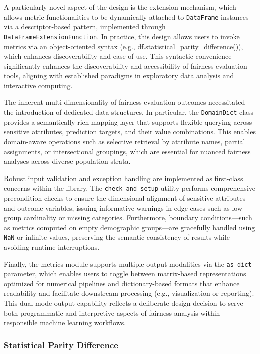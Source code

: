 \documentclass[12pt,a4paper,openright,twoside]{book}
\begin{document}
A particularly novel aspect of the design is the extension mechanism, which allows metric functionalities to be dynamically attached to \texttt{DataFrame} instances via a descriptor-based pattern, implemented through \texttt{DataFrameExtensionFunction}. In practice, this design allows users to invoke metrics via an object-oriented syntax (e.g., df.statistical\_parity\_difference()), which enhances discoverability and ease of use. This syntactic convenience significantly enhances the discoverability and accessibility of fairness evaluation tools, aligning with established paradigms in exploratory data analysis and interactive computing.

The inherent multi-dimensionality of fairness evaluation outcomes necessitated the introduction of dedicated data structures. In particular, the \texttt{DomainDict} class provides a semantically rich mapping layer that supports flexible querying across sensitive attributes, prediction targets, and their value combinations. This enables domain-aware operations such as selective retrieval by attribute names, partial assignments, or intersectional groupings, which are essential for nuanced fairness analyses across diverse population strata.

Robust input validation and exception handling are implemented as first-class concerns within the library. The \texttt{check\_and\_setup} utility performs comprehensive precondition checks to ensure the dimensional alignment of sensitive attributes and outcome variables, issuing informative warnings in edge cases such as low group cardinality or missing categories. Furthermore, boundary conditions—such as metrics computed on empty demographic groups—are gracefully handled using \texttt{NaN} or infinite values, preserving the semantic consistency of results while avoiding runtime interruptions.

Finally, the metrics module supports multiple output modalities via the \texttt{as\_dict} parameter, which enables users to toggle between matrix-based representations optimized for numerical pipelines and dictionary-based formats that enhance readability and facilitate downstream processing (e.g., visualization or reporting). This dual-mode output capability reflects a deliberate design decision to serve both programmatic and interpretive aspects of fairness analysis within responsible machine learning workflows.


\subsubsection{Statistical Parity Difference}
\end{document}
